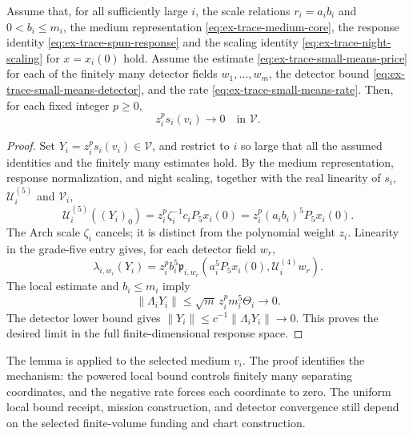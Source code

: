 \begin{lemma}
\label{lem:ex-trace-small-means}
Assume that, for all sufficiently large $i$, the scale relations
$r_i=a_ib_i$ and $0<b_i\le m_i$, the medium representation
\eqref{eq:ex-trace-medium-core}, the response identity
\eqref{eq:ex-trace-spun-response} and the scaling identity
\eqref{eq:ex-trace-night-scaling} for $x=x_i(0)$ hold. Assume the estimate
\eqref{eq:ex-trace-small-means-price} for each of the finitely many
detector fields $w_1,\ldots,w_m$, the detector bound
\eqref{eq:ex-trace-small-means-detector}, and the rate
\eqref{eq:ex-trace-small-means-rate}. Then, for each fixed integer
$p\geq0$,
\[
 z_i^p s_i(v_i)\longrightarrow0\quad\text{in }\mathcal V.
\]
\end{lemma}
\begin{proof}
Set $Y_i=z_i^p s_i(v_i)\in\mathcal V$, and restrict to $i$ so large that
all the assumed identities and the finitely many estimates hold. By the
medium representation,
response normalization, and night scaling, together with the real
linearity of $s_i$, $\mathcal U_i^{(5)}$ and $\mathcal V_i$,
\[
 \mathcal U_i^{(5)}((Y_i)_0)
 =z_i^p\zeta_i^{-1}c_iP_5x_i(0)
 =z_i^p(a_i b_i)^5P_5x_i(0).
\]
The Arch scale $\zeta_i$ cancels; it is distinct from the polynomial weight
$z_i$. Linearity in the grade-five entry gives, for each detector field
$w_r$,
\[
 \lambda_{i,w_r}(Y_i)
 =z_i^p b_i^5\mathfrak p_{i,w_r}
      (a_i^5P_5x_i(0),\mathcal U_i^{(4)}w_r).
\]
The local estimate and $b_i\leq m_i$ imply
\[
 \|\Lambda_iY_i\|
 \leq \sqrt m\,z_i^p m_i^5\Theta_i\longrightarrow0.
\]
The detector lower bound gives $\|Y_i\|\leq c^{-1}\|\Lambda_iY_i\|\to0$.
This proves the desired limit in the full finite-dimensional response
space.
\end{proof}

The lemma is applied to the selected medium $v_i$. The proof identifies
the mechanism: the powered local bound controls finitely many separating
coordinates, and the negative rate forces each coordinate to zero. The
uniform local bound receipt, mission construction, and detector convergence
still depend on the selected finite-volume funding and chart construction.
